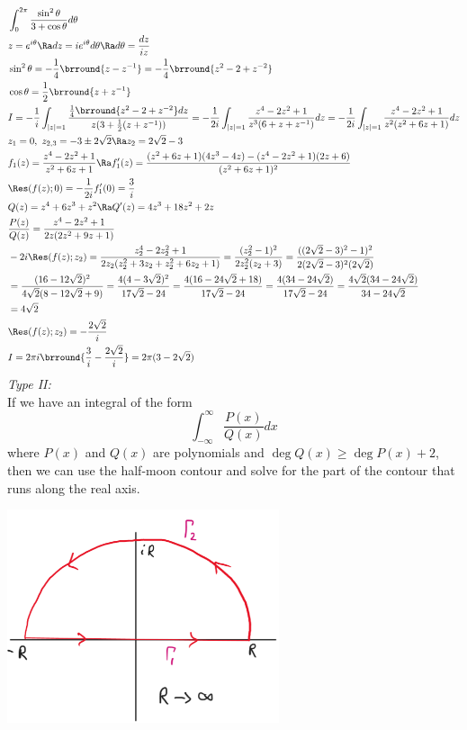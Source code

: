 \begin{align*}
    &\int_0^{2\pi}\frac{\sin^2\theta}{3+\cos\theta}d\theta\\
    &z=e^{i\theta}\Ra dz=ie^{i\theta}d\theta\Ra d\theta=\frac{dz}{iz}\\
    &\sin^2\theta=-\frac{1}{4}\brround{z-z^{-1}}=-\frac{1}{4}\brround{z^2-2+z^{-2}}\\
    &\cos\theta=\frac{1}{2}\brround{z+z^{-1}}\\
    &I=-\frac{1}{i}\int_{|z|=1}\frac{\frac{1}{4}\brround{z^2-2+z^{-2}}dz}{z(3+\frac{1}{2}(z+z^{-1}))}=-\frac{1}{2i}\int_{|z|=1}\frac{z^4-2z^2+1}{z^3(6+z+z^{-1})}dz=-\frac{1}{2i}\int_{|z|=1}\frac{z^4-2z^2+1}{z^2(z^2+6z+1)}dz\\
    &z_1=0,\ z_{2,3}=-3\pm2\sqrt{2}\Ra z_2=2\sqrt{2}-3\\
    &f_1(z)=\frac{z^4-2z^2+1}{z^2+6z+1}\Ra f_1'(z)=\frac{(z^2+6z+1)(4z^3-4z)-(z^4-2z^2+1)(2z+6)}{(z^2+6z+1)^2}\\
    &\Res(f(z);0)=-\frac{1}{2i}f_1'(0)=\frac{3}{i}\\
    &Q(z)=z^4+6z^3+z^2\Ra Q'(z)=4z^3+18z^2+2z\\
    &\frac{P(z)}{Q(z)}=\frac{z^4-2z^2+1}{2z(2z^2+9z+1)}\\
    &-2i\Res(f(z);z_2)=\frac{z_2^4-2z_2^2+1}{2z_2(z_2^2+3z_2+z_2^2+6z_2+1)}=\frac{(z_2^2-1)^2}{2z_2^2(z_2+3)}=\frac{((2\sqrt{2}-3)^2-1)^2}{2(2\sqrt{2}-3)^2(2\sqrt{2})}\\
    &=\frac{(16-12\sqrt{2})^2}{4\sqrt{2}(8-12\sqrt{2}+9)}=\frac{4(4-3\sqrt{2})^2}{17\sqrt{2}-24}=\frac{4(16-24\sqrt{2}+18)}{17\sqrt{2}-24}=\frac{4(34-24\sqrt{2})}{17\sqrt{2}-24}=\frac{4\sqrt{2}(34-24\sqrt{2})}{34-24\sqrt{2}}\\
    &=4\sqrt{2}\\
    &\Res(f(z);z_2)=-\frac{2\sqrt{2}}{i}\\
    &I=2\pi i\brround{\frac{3}{i}-\frac{2\sqrt{2}}{i}}=2\pi(3-2\sqrt{2})
\end{align*}
\textit{Type II:}\\
If we have an integral of the form
\[\int_{-\infty}^\infty\frac{P(x)}{Q(x)}dx\]
where $P(x)$ and $Q(x)$ are polynomials and $\deg Q(x)\geq\deg P(x)+2$, then we can use the half-moon contour and solve for the part of the contour that runs along the real axis.\\
\centerline{\includegraphics[width=0.6\textwidth]{Images/ComplexAnalysisPictures/HalfMoon.png}}
